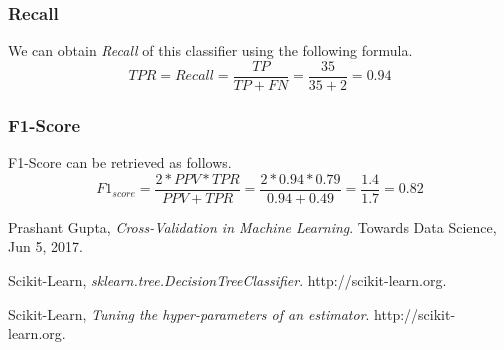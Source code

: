 \documentclass[12pt]{article}
\numberwithin{equation}{section}
\numberwithin{table}{section}
\numberwithin{figure}{section}
\begin{document}
\subsubsection{Recall}
We can obtain \textit{Recall} of this classifier using the following formula.
$$
TPR = Recall = \frac{TP}{TP + FN} = \frac{35}{35 + 2} = 0.94
$$

\subsubsection{F1-Score}
F1-Score can be retrieved as follows. 
$$
F1_{score} = \frac{2 * PPV * TPR}{PPV + TPR} = \frac{2 * 0.94 * 0.79}{0.94 + 0.49} = \frac{1.4}{1.7} = 0.82
$$
\newpage
\begin{thebibliography}{999}
	
	Prashant Gupta,
	\emph{Cross-Validation in Machine Learning}.
	Towards Data Science,
	Jun 5, 2017.
	
	Scikit-Learn,
	\emph{sklearn.tree.DecisionTreeClassifier}.
	http://scikit-learn.org.
	
	Scikit-Learn,
	\emph{Tuning the hyper-parameters of an estimator}.
	http://scikit-learn.org.
	
\end{thebibliography}
\end{document}

